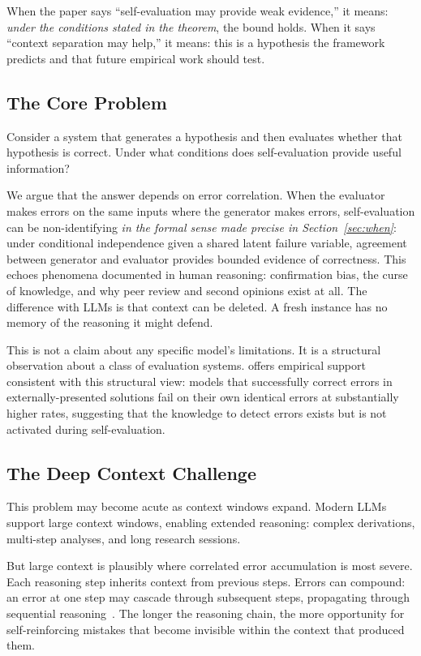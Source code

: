 \documentclass[11pt]{article}
\begin{document}
When the paper says ``self-evaluation may provide weak evidence,'' it means: \emph{under the conditions stated in the theorem}, the bound holds. When it says ``context separation may help,'' it means: this is a hypothesis the framework predicts and that future empirical work should test.

\subsection{The Core Problem}

Consider a system that generates a hypothesis and then evaluates whether that hypothesis is correct. Under what conditions does self-evaluation provide useful information?

We argue that the answer depends on error correlation. When the evaluator makes errors on the same inputs where the generator makes errors, self-evaluation can be non-identifying \emph{in the formal sense made precise in Section~\ref{sec:when}}: under conditional independence given a shared latent failure variable, agreement between generator and evaluator provides bounded evidence of correctness. This echoes phenomena documented in human reasoning: confirmation bias, the curse of knowledge, and why peer review and second opinions exist at all. The difference with LLMs is that context can be deleted. A fresh instance has no memory of the reasoning it might defend.

This is not a claim about any specific model's limitations. It is a structural observation about a class of evaluation systems. \citet{tsui2025selfcorrection} offers empirical support consistent with this structural view: models that successfully correct errors in externally-presented solutions fail on their own identical errors at substantially higher rates, suggesting that the knowledge to detect errors exists but is not activated during self-evaluation.

\subsection{The Deep Context Challenge}

This problem may become acute as context windows expand. Modern LLMs support large context windows, enabling extended reasoning: complex derivations, multi-step analyses, and long research sessions.

But large context is plausibly where correlated error accumulation is most severe. Each reasoning step inherits context from previous steps. Errors can compound: an error at one step may cascade through subsequent steps, propagating through sequential reasoning~\citep{tyen2024llmsstepbystep}. The longer the reasoning chain, the more opportunity for self-reinforcing mistakes that become invisible within the context that produced them.
\end{document}
